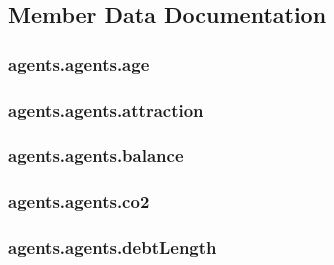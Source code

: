 \subsection{Member Data Documentation}
\hypertarget{classagents_1_1agents_a53209722a59cdca5994b5e9fe7a5f552}{
\subsubsection[{age}]{\setlength{\rightskip}{0pt plus 5cm}agents.\-agents.\-age}}\label{classagents_1_1agents_a53209722a59cdca5994b5e9fe7a5f552}
\hypertarget{classagents_1_1agents_a295f22a30ae7e7d97b4ad4fe6091601b}{
\subsubsection[{attraction}]{\setlength{\rightskip}{0pt plus 5cm}agents.\-agents.\-attraction}}\label{classagents_1_1agents_a295f22a30ae7e7d97b4ad4fe6091601b}
\hypertarget{classagents_1_1agents_a578158bdb5867e9fc644a312577b1a4f}{
\subsubsection[{balance}]{\setlength{\rightskip}{0pt plus 5cm}agents.\-agents.\-balance}}\label{classagents_1_1agents_a578158bdb5867e9fc644a312577b1a4f}
\hypertarget{classagents_1_1agents_a167134f52dea83bf9e2006a465579d52}{
\subsubsection[{co2}]{\setlength{\rightskip}{0pt plus 5cm}agents.\-agents.\-co2}}\label{classagents_1_1agents_a167134f52dea83bf9e2006a465579d52}
\hypertarget{classagents_1_1agents_a114129f82ed141bd1850e108be4619f7}{
\subsubsection[{debt\-Length}]{\setlength{\rightskip}{0pt plus 5cm}agents.\-agents.\-debt\-Length}}\label{classagents_1_1agents_a114129f82ed141bd1850e108be4619f7}
